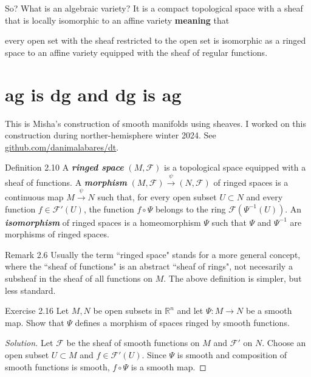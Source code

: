So? What is an algebraic variety? It is a compact topological space with a sheaf that is locally isomorphic to an affine variety \textbf{meaning} that 

\begin{tcolorbox}[colback=white,colframe=black,boxrule=0.5pt,sharp corners]
every open set with the sheaf restricted to the open set is isomorphic as a ringed space to an affine variety equipped with the sheaf of regular functions.
\end{tcolorbox}

\section{ag is dg and dg is ag}

This is Misha's construction of smooth manifolds using sheaves. I worked on this construction during norther-hemisphere winter 2024. See \href{https://github.com/danimalabares/dt}{github.com/danimalabares/dt}.

\begin{thing3}{Definition 2.10}\leavevmode
	A \textit{\textbf{ringed space}} $(M,\mathcal{F})$ is a topological space equipped with a sheaf of functions. A \textit{\textbf{morphism}} $(M,\mathcal{F}) \xrightarrow{\psi}(N,\mathcal{F})$ of ringed spaces is a continuous map $M \xrightarrow{\psi}N$ such that, for every open subset $U \subset N$ and every function $f \in \mathcal{F}'(U)$, the function $f \circ \Psi$ belongs to the ring $\mathcal{F}(\Psi^{-1}(U))$. An \textit{\textbf{isomorphism}} of ringed spaces is a homeomorphism $\Psi$ such that $\Psi$ and $\Psi^{-1}$ are morphisms of ringed spaces.
\end{thing3}

\begin{thing5}{Remark 2.6}\leavevmode
	Usually the term ``ringed space" stands for a more general concept, where the ``sheaf of functions" is an abstract ``sheaf of rings", not necesarily a subsheaf in the sheaf of all functions on  $M$. The above definition is simpler, but less standard.
\end{thing5}

\begin{thing4}{Exercise 2.16}\label{exer:2.16}\leavevmode
Let $M, N$ be open subsets in $\mathbb{R}^n$ and let  $\Psi:M \to N$ be a smooth map. Show that $\Psi$ defines a morphism of spaces ringed by smooth functions.
\end{thing4}

\begin{proof}[Solution]\leavevmode
Let $\mathcal{F}$ be the sheaf of smooth functions on $M$ and  $\mathcal{F}'$ on $N$. Choose an open subset $U\subset M$ and $f \in \mathcal{F}'(U)$. Since $\Psi$ is smooth and composition of smooth functions is smooth, $f \circ \Psi$ is a smooth map.
\end{proof}

